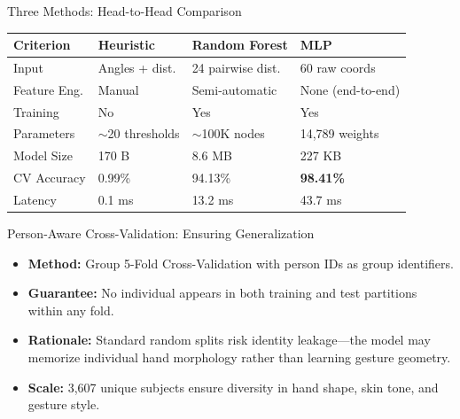 \documentclass[10pt, aspectratio=169]{beamer}
\begin{document}
\begin{frame}{Three Methods: Head-to-Head Comparison}
    \centering
    \begin{table}
        \small
        \begin{tabular}{@{}llll@{}}
            \toprule
            \textbf{Criterion} & \textbf{Heuristic} & \textbf{Random Forest} & \textbf{MLP} \\
            \midrule
            Input & Angles + dist. & 24 pairwise dist. & 60 raw coords \\
            Feature Eng. & Manual & Semi-automatic & None (end-to-end) \\
            Training & No & Yes & Yes \\
            Parameters & $\sim$20 thresholds & $\sim$100K nodes & 14,789 weights \\
            Model Size & \textcolor{accentgreen}{170 B} & 8.6 MB & 227 KB \\
            \midrule
            CV Accuracy & \textcolor{alertred}{0.99\%} & 94.13\% & \textcolor{accentgreen}{\textbf{98.41\%}} \\
            Latency & \textcolor{accentgreen}{0.1 ms} & 13.2 ms & 43.7 ms \\
            \bottomrule
        \end{tabular}
    \end{table}
\end{frame}

\begin{frame}{Person-Aware Cross-Validation: Ensuring Generalization}
    \begin{itemize}
        \item \textbf{Method:} Group 5-Fold Cross-Validation with person IDs as group identifiers.
        \item \textbf{Guarantee:} No individual appears in both training and test partitions within any fold.
        \item \textbf{Rationale:} Standard random splits risk identity leakage---the model may memorize individual hand morphology rather than learning gesture geometry.
        \item \textbf{Scale:} 3,607 unique subjects ensure diversity in hand shape, skin tone, and gesture style.
    \end{itemize}
\end{frame}
\end{document}
